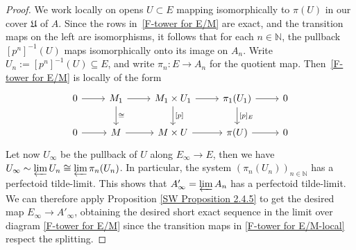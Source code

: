 \documentclass[10pt,oneside]{amsart}
\theoremstyle{definition}
\begin{document}
		\begin{proof}
			We work locally on opens $U\subset E$ mapping isomorphically to $\pi(U)$ in our cover $\mathfrak U$ of $A$. Since the rows in~\eqref{F-tower for E/M} are exact, and the transition maps on the left are isomorphisms, it follows that for each $n\in \mathbb{N}$, the pullback $[p^n]^{-1}(U)$ maps isomorphically onto its image on $A_n$. Write $U_n:=[p^n]^{-1}(U)\subseteq E$, and write $\pi_n:E\to A_n$ for the quotient map. Then~\eqref{F-tower for E/M} is locally of the form
				\begin{equation}\label{F-tower for E/M-local}
				\begin{tikzcd}
				0 \arrow[r] & M_1\arrow[d, "\cong"] \arrow[r] &  M_1\times U_1 \arrow[d, "{[p]}"] \arrow[r] &\pi_1(U_1) \arrow[d, "{[p]_E}"] \arrow[r] & 0 \\
				0 \arrow[r] & M \arrow[r] & M\times U \arrow[r] & \pi(U) \arrow[r] & 0
				\end{tikzcd}
				\end{equation}
			Let now $U_\infty$ be the pullback of $U$ along $E_\infty\to E$, then we have $U_\infty\sim \varprojlim U_n\cong \varprojlim \pi_n(U_n)$. In particular, the system $(\pi_n(U_n))_{n\in \mathbb{N}}$ has a perfectoid tilde-limit. This shows that $A'_\infty=\varprojlim A_n$ has a perfectoid tilde-limit. We can therefore apply Proposition \ref{SW Proposition 2.4.5} to get the desired map $E_\infty\rightarrow A'_\infty$, obtaining the desired short exact sequence in the limit over diagram \eqref{F-tower for E/M} since the transition maps in \eqref{F-tower for E/M-local} respect the splitting. 
		\end{proof}
	
\end{document}

